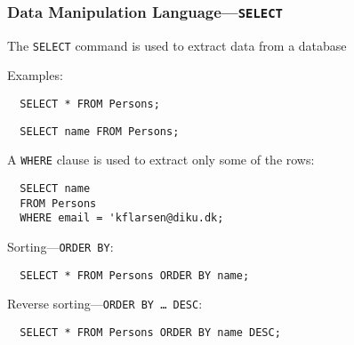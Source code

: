 \documentclass[dvipsnames,handout]{beamer}
\begin{document}
\begin{frame}[fragile=singleslide]
\frametitle{Data Manipulation Language---\texttt{SELECT}} 

The  \texttt{SELECT} command is used to extract data from a database

Examples:

\begin{small}
\begin{verbatim}
  SELECT * FROM Persons;
\end{verbatim}
\end{small}


\begin{small}
\begin{verbatim}
  SELECT name FROM Persons;
\end{verbatim}
\end{small}

A \texttt{WHERE} clause is used to extract only some of the rows:

\begin{small}
\begin{verbatim}
  SELECT name 
  FROM Persons 
  WHERE email = 'kflarsen@diku.dk;
\end{verbatim}
\end{small}

Sorting---\texttt{ORDER BY}:
\begin{small}
\begin{verbatim}
  SELECT * FROM Persons ORDER BY name;
\end{verbatim}
\end{small}

Reverse sorting---\texttt{ORDER BY \ldots{} DESC}:
\begin{small}
\begin{verbatim}
  SELECT * FROM Persons ORDER BY name DESC;
\end{verbatim}
\end{small}

\end{frame}
\end{document}
